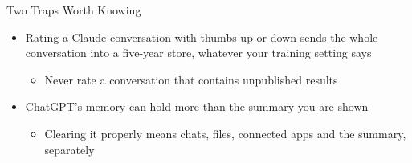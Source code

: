 \documentclass[aspectratio=169]{beamer}
\begin{document}
\begin{frame}{Two Traps Worth Knowing}
    \begin{itemize}\setlength{\itemsep}{7pt}
        \item Rating a Claude conversation with thumbs up or down sends the whole
              conversation into a five-year store, whatever your training setting says
        \begin{itemize}
            \item Never rate a conversation that contains unpublished results
        \end{itemize}
        \item ChatGPT's memory can hold more than the summary you are shown
        \begin{itemize}
            \item Clearing it properly means chats, files, connected apps and the summary,
                  separately
        \end{itemize}
    \end{itemize}
\end{frame}
\end{document}
